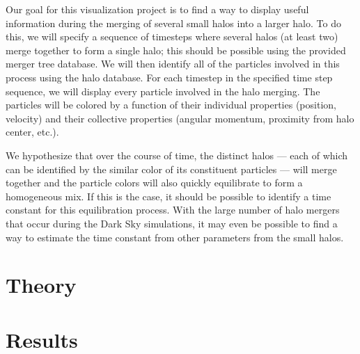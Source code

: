 \documentclass[12pt]{article}
\begin{document}
Our goal for this visualization project is to find a way to display useful
information during the merging of several small halos into a larger halo. To do
this, we will specify a sequence of timesteps where several halos (at least
two) merge together to form a single halo; this should be possible using the
provided merger tree database. We will then identify all of the particles
involved in this process using the halo database. For each timestep in the
specified time step sequence, we will display every particle involved in the
halo merging. The particles will be colored by a function of their individual
properties (position, velocity) and their collective properties (angular
momentum, proximity from halo center, etc.).

We hypothesize that over the course of time, the distinct halos --- each of
which can be identified by the similar color of its constituent particles ---
will merge together and the particle colors will also quickly equilibrate to
form a homogeneous mix. If this is the case, it should be possible to identify
a time constant for this equilibration process. With the large number of halo
mergers that occur during the Dark Sky simulations, it may even be possible to
find a way to estimate the time constant from other parameters from the small
halos.

\section{Theory}

\section{Results}



\nocite{*}
\end{document}
